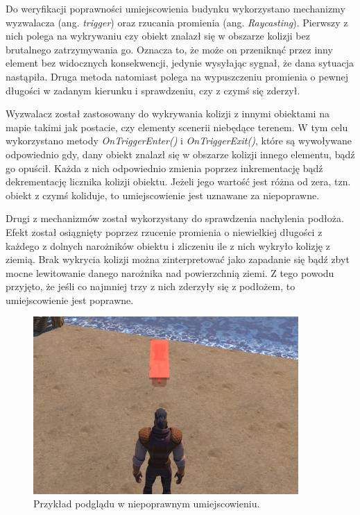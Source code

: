 Do weryfikacji poprawności umiejscowienia budynku wykorzystano mechanizmy wyzwalacza (ang. \textit{trigger}) oraz rzucania
promienia (ang. \textit{Raycasting}). Pierwszy z nich polega na wykrywaniu czy obiekt znalazł się w obszarze kolizji bez
brutalnego zatrzymywania go. Oznacza to, że może on przeniknąć przez inny element bez widocznych konsekwencji, jedynie
wysyłając sygnał, że dana sytuacja nastąpiła. Druga metoda natomiast polega na wypuszczeniu promienia o pewnej długości
w zadanym kierunku i sprawdzeniu, czy z czymś się zderzył.

Wyzwalacz został zastosowany do wykrywania kolizji z innymi obiektami na mapie takimi jak postacie, czy elementy
scenerii niebędące terenem. W tym celu wykorzystano metody \textit{OnTriggerEnter()} i \textit{OnTriggerExit()}, które są wywoływane
odpowiednio gdy, dany obiekt znalazł się w obszarze kolizji innego elementu, bądź go opuścił. Każda z nich odpowiednio
zmienia poprzez inkrementację bądź dekrementację licznika kolizji obiektu. Jeżeli jego wartość jest różna od zera, tzn.
obiekt z czymś koliduje, to umiejscowienie jest uznawane za niepoprawne.

Drugi z mechanizmów został wykorzystany do sprawdzenia nachylenia podłoża. Efekt został osiągnięty poprzez rzucenie
promienia o niewielkiej długości z każdego z dolnych narożników obiektu i zliczeniu ile z nich wykryło kolizję z ziemią.
Brak wykrycia kolizji można zinterpretować jako zapadanie się bądź zbyt mocne lewitowanie danego narożnika nad
powierzchnią ziemi. Z tego powodu przyjęto, że jeśli co najmniej trzy z nich zderzyły się z podłożem, to umiejscowienie
jest poprawne.

\begin{figure}[h!]
    \centering
    \includegraphics[width=0.9\textwidth]{images/implementacja/mechanizm_budowania/niepoprawne.png}
    \caption{Przykład podglądu w niepoprawnym umiejscowieniu.}
\end{figure}

